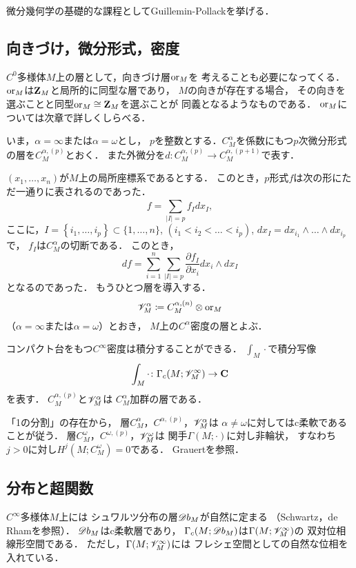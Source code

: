 微分幾何学の基礎的な課程としてGuillemin-Pollack\cite{GP74}を挙げる．

\subsection{向きづけ，微分形式，密度}
\(C^0\)多様体\(M\)上の層として，向きづけ層\(\mathord{\mathrm{or}} _M\)を
考えることも必要になってくる．
\(\mathord{\mathrm{or}}_M\)は\(\mathbf{Z}_M\)と局所的に同型な層であり，
\(M\)の向きが存在する場合，
その向きを選ぶことと同型\(\mathord{\mathrm{or}}_M\cong\mathbf{Z}_M\)を選ぶことが
同義となるようなものである．
\(\mathord{\mathrm{or}}_M\)については次章で詳しくしらべる．

いま，\(\alpha=\infty\)または\(\alpha=\omega\)とし，
\(p\)を整数とする．\(C^\alpha_M\)を係数にもつ\(p\)次微分形式
の層を\(C_M^{\alpha,(p)}\)とおく．
また外微分を\(
    d\colon C_M^{\alpha,(p)}\to C_M^{\alpha,(p+1)}
\)で表す．

\((x_1,\dots,x_n)\)が\(M\)上の局所座標系であるとする．
このとき，\(p\)形式\(f\)は次の形にただ一通りに表されるのであった．
\[
    f=\sum_{\lvert I\rvert=p}^{}f_Idx_I,
\]ここに，\(
    I=\left\{i_1,\dots,i_p\right\}\subset\{1,\dots,n\}
\), \((i_1<i_2<\dots<i_p)\), 
\(dx_I=dx_{i_1}\wedge\dots\wedge dx_{i_p}\)で，
\(f_I\)は\(C^\alpha_M\)の切断である．
このとき，\[
    df=\sum_{i=1}^{n}\sum_{\lvert I\rvert=p}^{}\frac{\partial f_I}{\partial x_i}dx_i\wedge dx_I
\]となるのであった．
もうひとつ層を導入する．
\[
    \mathscr{V}_M^\alpha
    \coloneqq
    C^{\alpha,(n)}_M\otimes\mathord{\mathrm{or}}_M
\]（\(\alpha=\infty\)または\(\alpha=\omega\)）とおき，
\(M\)上の\(C^\alpha\)密度の層とよぶ．

コンパクト台をもつ\(C^\infty\)密度は積分することができる．
\(\int_M\cdot\)で積分写像
\begin{equation}
    \int_M\cdot\colon\Gamma_c(M;\mathscr{V}_M^\infty)\to\mathbf{C} \label{eq:int}
\end{equation}を表す．
\(C^{\alpha,(p)}_M\)と\(\mathscr{V}_M^\alpha\)は
\(C^\alpha_M\)加群の層である．

「1の分割」の存在から，
層\(C^\alpha_M\)，\(C^{\alpha,(p)}\)，\(\mathscr{V}_M^\alpha\)は
\(\alpha\neq\omega\)に対してはc柔軟であることが従う．
層\(C^\omega_M\)，\(C^{\omega,(p)}\)，\(\mathscr{V}_M^\omega\)は
関手\(\Gamma(M;\cdot)\)に対し非輪状，
すなわち\(j>0\)に対し\(H^j(M;C^\omega_M)=0\)である．
Grauert\cite{G58}を参照．

\subsection{分布と超関数}
\(C^\infty\)多様体\(M\)上には
シュワルツ分布の層\(\mathord{\mathscr{D}b}_M\)が自然に定まる
（Schwartz\cite{S66}，de Rham\cite{R55}を参照）．
\(\mathord{\mathscr{D}b}_M\)はc柔軟層であり，
\(\Gamma_c(M;\mathord{\mathscr{D}b}_M)\)は\(\Gamma(M;\mathscr{V}_M^\infty)\)の
双対位相線形空間である．
ただし，\(\Gamma(M;\mathscr{V}_M^\infty)\)には
フレシェ空間としての自然な位相を入れている．

